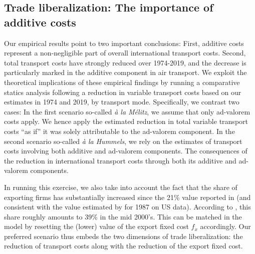 \documentclass[a4paper,11pt]{article}
\begin{document}
\subsection{Trade liberalization: The importance of additive costs}

Our empirical results point to two important conclusions: First, additive costs represent a non-negligible part of overall international transport costs. Second, total transport costs have strongly reduced over 1974-2019, and the decrease is particularly marked in the additive component in air transport. We exploit the theoretical implications of these empirical findings by running a comparative statics analysis following a reduction in variable transport costs based on our estimates in 1974 and 2019, by transport mode. Specifically, we contrast two cases: In the first scenario so-called \textit{à la Mélitz}, we assume that only ad-valorem costs apply. We hence apply the estimated reduction in total variable transport costs ``as if'' it was solely attributable to the ad-valorem component. In the second scenario so-called \textit{à la Hummels}, we rely on the estimates of transport costs involving both additive and ad-valorem components. The consequences of the reduction in international transport costs through both its additive and ad-valorem components.

In running this exercise, we also take into account the fact that the share of exporting firms has substantially increased since the 21\% value reported in \cite{BEJK-AER-03} (and consistent with the value estimated by \citet{Lincoln_McCallum2018} for 1987 on US data). According to \cite{Lincoln_McCallum2018}, this share roughly amounts to 39\% in the mid 2000's. This can be matched in the model by resetting the (lower) value of the export fixed cost $f_x$ accordingly. Our preferred scenario thus embeds the two dimensions of trade liberalization: the reduction of transport costs along with the reduction of the export fixed cost.
\end{document}
